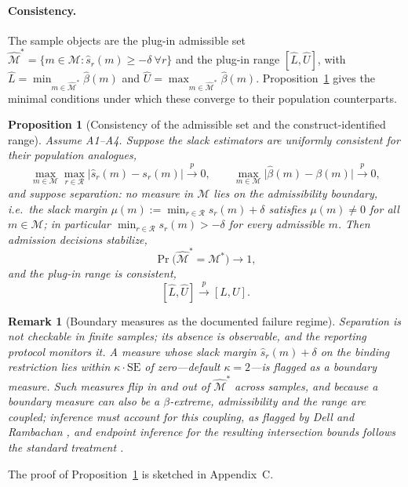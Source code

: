 \documentclass[10pt,letterpaper]{article}
\newtheorem{proposition}{Proposition}[section]
\newtheorem{remark}{Remark}[section]
\newcommand{\M}{\ensuremath{\mathcal{M}}}
\begin{document}
\paragraph{Consistency.}
The sample objects are the plug-in admissible set $\hat{\M}^*=\{m\in\M:\hat{s}_r(m)\ge-\delta\ \forall r\}$ and the plug-in range $[\hat L,\hat U]$, with $\hat L=\min_{m\in\hat{\M}^*}\hat{\beta}(m)$ and $\hat U=\max_{m\in\hat{\M}^*}\hat{\beta}(m)$. Proposition~\ref{prop:consistency} gives the minimal conditions under which these converge to their population counterparts.

\begin{proposition}[Consistency of the admissible set and the construct-identified range]\label{prop:consistency}
Assume A1--A4. Suppose the slack estimators are uniformly consistent for their population analogues,
\begin{equation}
\max_{m\in\M}\max_{r\in\mathcal{R}}\bigl|\hat{s}_r(m)-s_r(m)\bigr|\xrightarrow{p}0,
\qquad
\max_{m\in\M}\bigl|\hat{\beta}(m)-\beta(m)\bigr|\xrightarrow{p}0,
\label{eq:uniform}
\end{equation}
and suppose separation: no measure in $\M$ lies on the admissibility boundary, i.e.\ the slack margin $\mu(m):=\min_{r\in\mathcal{R}}s_r(m)+\delta$ satisfies $\mu(m)\neq 0$ for all $m\in\M$; in particular $\min_{r\in\mathcal{R}}s_r(m)>-\delta$ for every admissible $m$. Then admission decisions stabilize,
\[
\Pr\bigl(\hat{\M}^*=\M^*\bigr)\to 1,
\]
and the plug-in range is consistent,
\[
[\hat L,\hat U]\xrightarrow{p}[L,U].
\]
\end{proposition}

\begin{remark}[Boundary measures as the documented failure regime]\label{rem:boundary}
Separation is not checkable in finite samples; its absence is observable, and the reporting protocol monitors it. A measure whose slack margin $\hat{s}_r(m)+\delta$ on the binding restriction lies within $\kappa\cdot\mathrm{SE}$ of zero---default $\kappa=2$---is flagged as a boundary measure. Such measures flip in and out of $\hat{\M}^*$ across samples, and because a boundary measure can also be a $\beta$-extreme, admissibility and the range are coupled; inference must account for this coupling, as flagged by Dell and Rambachan \cite{dellrambachan2026}, and endpoint inference for the resulting intersection bounds follows the standard treatment \cite{imbensmanski2004,stoye2009}.
\end{remark}

The proof of Proposition~\ref{prop:consistency} is sketched in Appendix~C.
\end{document}

